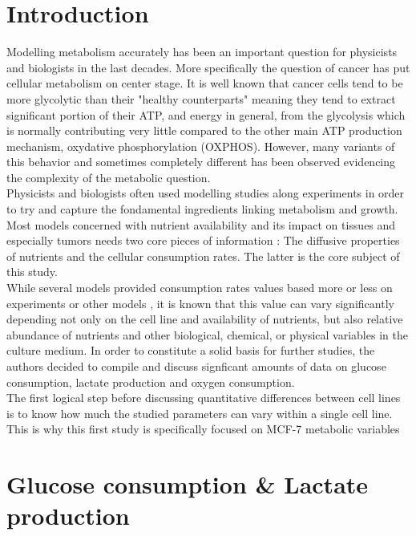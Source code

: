 \documentclass[11pt,a4paper]{article}
\begin{document}
\section{Introduction}
Modelling metabolism accurately has been an important question for physicists and biologists in the last decades. More specifically the question of cancer has put cellular metabolism on center stage. It is well known that cancer cells tend to be more glycolytic than their "healthy counterparts" meaning they tend to extract significant portion of their ATP, and energy in general, from the glycolysis which is normally contributing very little compared to the other main ATP production mechanism, oxydative phosphorylation (OXPHOS). However, many variants of this behavior and sometimes completely different has been observed evidencing the complexity of the metabolic question.\cite{Berg2006}\\

Physicists and biologists often used modelling studies along experiments in order to try and capture the fondamental ingredients linking metabolism and growth. Most models concerned with nutrient availability and its impact on tissues and especially tumors needs two core pieces of information : The diffusive properties of nutrients and the cellular consumption rates. The latter is the core subject of this study.\\

While several models provided consumption rates values based more or less on experiments or other models , it is known that this value can vary significantly depending not only on the cell line and availability of nutrients, but also relative abundance of nutrients and other biological, chemical, or physical variables in the culture medium. In order to constitute a solid basis for further studies, the authors decided to compile and discuss signficant amounts of data on glucose consumption, lactate production and oxygen consumption.\\

The first logical step before discussing quantitative differences between cell lines is to know how much the studied parameters can vary within a single cell line. This is why this first study is specifically focused on MCF-7 metabolic variables

\section{Glucose consumption \& Lactate production}
\end{document}
